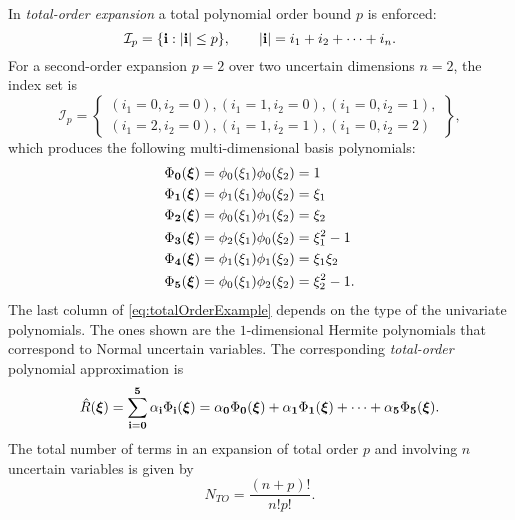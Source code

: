 In \textit{total-order expansion} a total polynomial order bound \(p\) is enforced:
\begin{equation}
	\mathcal{I}_p = \{\mathbf{i}:|\mathbf{i}| \leq p \}, \qquad |\mathbf{i}|=i_1+i_2+\cdots +i_n.
\end{equation}
For a second-order expansion \(p=2\) over two uncertain dimensions \(n=2\), the index set is
\begin{equation}
  \mathcal{I}_p = \left \{\begin{array}{c}
	(i_1=0,i_2=0),(i_1=1,i_2=0),(i_1=0,i_2=1),\\
    (i_1=2,i_2=0),(i_1=1,i_2=1),(i_1=0,i_2=2)
\end{array}\right \},
\end{equation}
which produces the following multi-dimensional basis polynomials:
\begin{equation}
\begin{alignedat}{2}
  \Phi_\mathbf{0}(\boldsymbol{\xi}) & = \phi_0(\xi_1) \phi_0(\xi_2) & & = 1 \\
  \Phi_\mathbf{1}(\boldsymbol{\xi}) & = \phi_1(\xi_1) \phi_0(\xi_2) & & = \xi_1 \\
  \Phi_\mathbf{2}(\boldsymbol{\xi}) & = \phi_0(\xi_1) \phi_1(\xi_2) & & = \xi_2 \\
  \Phi_\mathbf{3}(\boldsymbol{\xi}) & = \phi_2(\xi_1) \phi_0(\xi_2) & & = \xi_1^2-1 \\
  \Phi_\mathbf{4}(\boldsymbol{\xi}) & = \phi_1(\xi_1) \phi_1(\xi_2) & & = \xi_1 \xi_2 \\
  \Phi_\mathbf{5}(\boldsymbol{\xi}) & = \phi_0(\xi_1) \phi_2(\xi_2) & & = \xi_2^2-1.
\end{alignedat}
\label{eq:totalOrderExample}
\end{equation}
The last column of \cref{eq:totalOrderExample} depends on the type of the univariate polynomials. The ones shown are the $1$-dimensional Hermite polynomials that correspond to Normal uncertain variables.
The corresponding \textit{total-order} polynomial approximation is
\begin{equation}
  \hat{R}(\boldsymbol{\xi}) = \sum_{\mathbf{i}=\mathbf{0}}^{\mathbf{5}}\alpha_{\mathbf{i}} \Phi_{\mathbf{i}}(\boldsymbol{\xi}) = \alpha_{\mathbf{0}} \Phi_\mathbf{0}(\boldsymbol{\xi}) + \alpha_{\mathbf{1}} \Phi_\mathbf{1}(\boldsymbol{\xi}) + \cdots + \alpha_{\mathbf{5}} \Phi_\mathbf{5}(\boldsymbol{\xi}).
\end{equation}
The total number of terms in an expansion of total order \(p\) and involving \(n\) uncertain variables is given by
\begin{equation}
	N_{TO} = \frac{(n+p)!}{n!p!}.
  \label{eq:NtotalOrder}
\end{equation}

